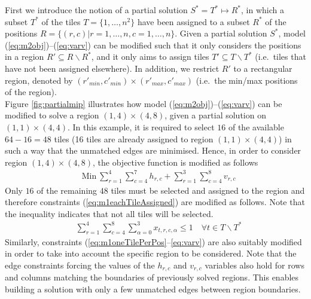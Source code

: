 \documentclass[preprint,12pt]{elsarticle}
\begin{document}
{First we introduce the notion of a partial solution $S^\ast = T^\ast \mapsto R^\ast$, in which a subset $T^\ast$ of the tiles $T = \{ 1,\ldots, n^2\}$ have been assigned to a subset $R^\ast$ of the positions $R = \{(r,c) | r = 1,\ldots,n, c = 1,\ldots, n\}$.
Given a partial solution $S^\ast$, model (\ref{eq:m2obj})--(\ref{eq:varv}) can be modified such that it only considers the positions in a region $R'\subseteq R\backslash R^\ast$, and it only aims to assign tiles $T' \subseteq T\backslash T^\ast$ (i.e.\ tiles that have not been assigned elsewhere).
In addition, we restrict $R'$ to a rectangular region, denoted by $(r'_{min},c'_{min})\times (r'_{max},c'_{max})$ (i.e.\ the min/max positions of the region).\\
Figure \ref{fig:partialmip} illustrates how model (\ref{eq:m2obj})--(\ref{eq:varv}) can be modified to solve a region $(1,4)\times(4,8)$, given a partial solution on $(1,1)\times(4,4)$.
In this example, it is required to select $16$ of the available $64-16 = 48$ tiles (16 tiles are already assigned to region $(1,1)\times(4,4)$) in such a way that
the unmatched edges are minimised.
Hence, in order to consider region $(1,4) \times (4,8)$, the objective function is modified as follows
\begin{align}
& \textrm{Min}\ \sum_{r=1}^{4} \sum_{c=4}^{7} h_{r,c} + \sum_{r=1}^{3} \sum_{c=4}^{8} v_{r,c}
\end{align}
Only $16$ of the remaining $48$ tiles must be selected and assigned to the region and therefore constraints 
(\ref{eq:m1eachTileAssigned}) are modified as follows.
Note that the inequality indicates that not all tiles will be selected.
\begin{align}
&\sum_{r=1}^4 \sum_{c=4}^8 \sum_{\alpha=0}^3 x_{t,r,c,\alpha}    \leq 1  \quad \forall t \in T\backslash T^\ast
\end{align}
Similarly, constraints (\ref{eq:m1oneTilePerPos}--\ref{eq:varv}) 
are also suitably modified in order to take into account the specific region to be considered.
Note that the edge constraints forcing the values of the $h_{r,c}$ and $v_{r,c}$ variables also hold for rows and columns matching the boundaries of previously solved regions.
This enables building a solution with only a few unmatched edges between region boundaries.

}
\end{document}
